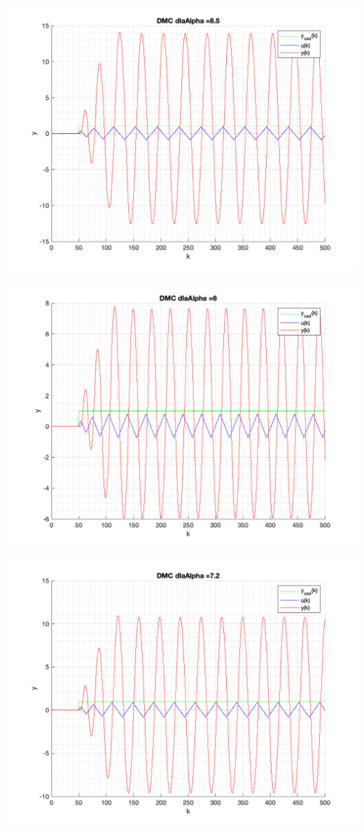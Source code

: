 \documentclass[a4paper, 11pt]{article}
\begin{document}
\begin{enumerate}
 \includegraphics[width=\linewidth]{./ModelsDodatkowe_Alpha/P4_DMC_Alpha_8_5_png.png} 
 
 \includegraphics[width=\linewidth]{./ModelsDodatkowe_Alpha/P4_DMC_Alpha_6_png.png} 
 
 \includegraphics[width=\linewidth]{./ModelsDodatkowe_Alpha/P4_DMC_Alpha_7_2_png.png} 
 

\end{enumerate}
\end{document}
